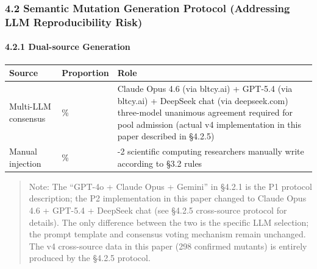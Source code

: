 \documentclass[review,12pt,authoryear]{elsarticle}
\begin{document}
\subsubsection{4.2 Semantic Mutation Generation Protocol (Addressing LLM
Reproducibility
Risk)}\label{semantic-mutation-generation-protocol-addressing-llm-reproducibility-risk}

\paragraph{4.2.1 Dual-source Generation}\label{dual-source-generation}

{\def\LTcaptype{none} %
\begin{longtable}[]{@{}
  >{\raggedright\arraybackslash}p{}
  >{\raggedright\arraybackslash}p{}
  >{\raggedright\arraybackslash}p{}@{}}
\toprule\noalign{}
\begin{minipage}[b]{\linewidth}\raggedright
Source
\end{minipage} & \begin{minipage}[b]{\linewidth}\raggedright
Proportion
\end{minipage} & \begin{minipage}[b]{\linewidth}\raggedright
Role
\end{minipage} \\
\midrule\noalign{}
\endhead
\bottomrule\noalign{}
\endlastfoot
Multi-LLM consensus & 60\% & Claude Opus 4.6 (via bltcy.ai) + GPT-5.4
(via bltcy.ai) + DeepSeek chat (via deepseek.com) three-model unanimous
agreement required for pool admission (actual v4 implementation in this
paper described in §4.2.5) \\
Manual injection & 40\% & 1-2 scientific computing researchers manually
write according to §3.2 rules \\
\end{longtable}
}

\begin{quote}
Note: The ``GPT-4o + Claude Opus + Gemini'' in §4.2.1 is the P1 protocol
description; the P2 implementation in this paper changed to Claude Opus
4.6 + GPT-5.4 + DeepSeek chat (see §4.2.5 cross-source protocol for
details). The only difference between the two is the specific LLM
selection; the prompt template and consensus voting mechanism remain
unchanged. The v4 cross-source data in this paper (298 confirmed
mutants) is entirely produced by the §4.2.5 protocol.
\end{quote}
\end{document}
